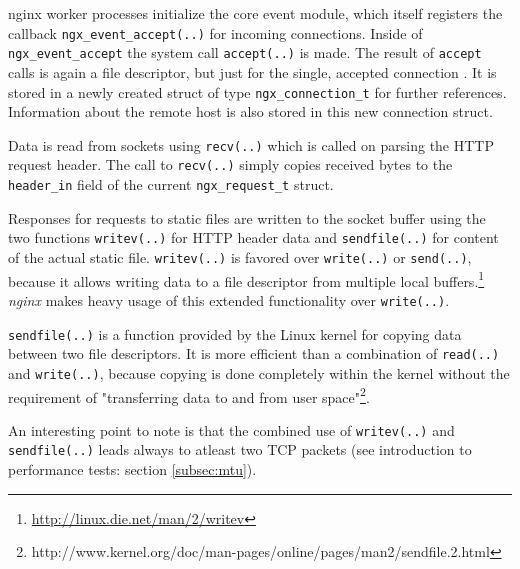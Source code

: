 nginx worker processes initialize the core event module, which itself registers the callback \texttt{ngx\_event\_accept(..)} for incoming connections. Inside of \texttt{ngx\_event\_accept} the system call \texttt{accept(..)} is made. The result of \texttt{accept} calls is again a file descriptor, but just for the single, accepted connection \cite{beejs}. It is stored in a newly created struct of type \texttt{ngx\_connection\_t} for further references. Information about the remote host is also stored in this new connection struct.

Data is read from sockets using \texttt{recv(..)} which is called on parsing the HTTP request header. The call to \texttt{recv(..)} simply copies received bytes to the \texttt{header\_in} field of the current \texttt{ngx\_request\_t} struct.

Responses for requests to static files are written to the socket buffer using the two functions \texttt{writev(..)} for HTTP header data and \texttt{sendfile(..)} for content of the actual static file. \texttt{writev(..)} is favored over \texttt{write(..)} or \texttt{send(..)}, because it allows writing data to a file descriptor from multiple local buffers.\footnote{\url{http://linux.die.net/man/2/writev}} \textit{nginx} makes heavy usage of this extended functionality over \texttt{write(..)}. 

\texttt{sendfile(..)} is a function provided by the Linux kernel for copying data between two file descriptors. It is more efficient than a combination of \texttt{read(..)} and \texttt{write(..)}, because copying is done completely within the kernel without the requirement of "transferring data to and from user space"\footnote{http://www.kernel.org/doc/man-pages/online/pages/man2/sendfile.2.html}.

An interesting point to note is that the combined use of \texttt{writev(..)} and \texttt{sendfile(..)} leads always to atleast two TCP packets (see introduction to performance tests: section \ref{subsec:mtu}).